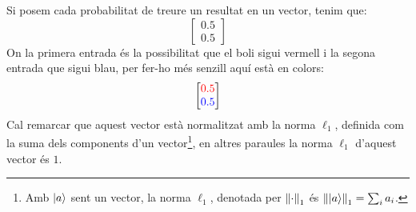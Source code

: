 Si posem cada probabilitat de treure un resultat en un vector, tenim que:
$$
\begin{bmatrix}
	0.5 \\
	0.5
\end{bmatrix}
$$
On la primera entrada és la possibilitat que el boli sigui vermell i la segona entrada que sigui blau, per fer-ho més senzill aquí està en colors:
$$
\begin{bmatrix}
	\textcolor{red}{0.5} \\
	\textcolor{blue}{0.5}
\end{bmatrix}
$$
Cal remarcar que aquest vector està normalitzat amb la norma $\ell_1$, definida com la suma dels components d'un vector\footnote{Amb $\ket{a}$ sent un vector, la norma $\ell_1$, denotada per $\norm{\cdot}_1$ és $\norm{\ket{a}}_1 = \sum_i a_i$.}, en altres paraules la norma $\ell_1$ d'aquest vector és $1$.

